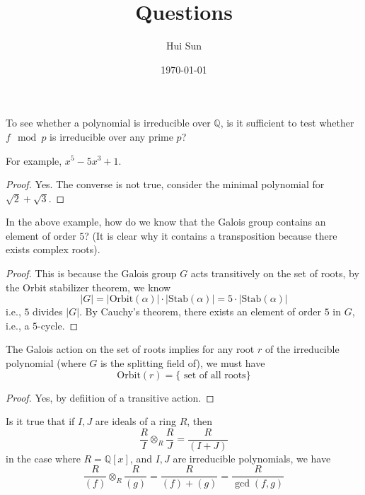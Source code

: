 \documentclass[openany]{book}
\title{Questions}
\date{\today}
\author{Hui Sun}
\newcommand{\Q}{\mathbb{Q}}
\begin{document}
\maketitle



\begin{prob}
    To see whether a polynomial is irreducible over $\Q$, is it sufficient to test whether $f\mod p$ is irreducible over any prime $p$?

    For example, $x^5-5x^3+1$.
\end{prob}
\begin{proof}
    Yes. The converse is not true, consider the minimal polynomial for $\sqrt{2}+\sqrt{3}$.
\end{proof}


\begin{prob}
    In the above example, how do we know that the Galois group contains an element of order $5$? (It is clear why it contains a transposition because there exists complex roots).
\end{prob}
\begin{proof}
    This is because the Galois group $G$ acts transitively on the set of roots, by the Orbit stabilizer theorem, we know 
    \begin{equation*}
        |G|=|\text{Orbit}(\alpha)|\cdot|\text{Stab}(\alpha)|=5\cdot|\text{Stab}(\alpha)|
    \end{equation*}
    i.e., $5$ divides $|G|$. By Cauchy's theorem, there exists an element of order $5$ in $G$, i.e., a $5$-cycle.
\end{proof}

\begin{prob}
    The Galois action on the set of roots implies for any root $r$ of the irreducible polynomial (where $G$ is the splitting field of), we must have 
    \begin{equation*}
        \text{Orbit}(r)=\{\text{ set of all roots}\}
    \end{equation*}
\end{prob}
\begin{proof}
    Yes, by defiition of a transitive action.
\end{proof}


\begin{prob}
    Is it true that if $I,J$ are ideals of a ring $R$, then 
    \begin{equation*}
        \frac{R}{I}\otimes_R\frac{R}{J}=\frac{R}{(I+J)}
    \end{equation*}
    in the case where $R=\Q[x]$, and $I,J$ are irreducible polynomials, we have 
    \begin{equation*}
        \frac{R}{(f)}\otimes_R\frac{R}{(g)}=\frac{R}{(f)+(g)}=\frac{R}{\gcd(f,g)}
    \end{equation*}
\end{prob}
\end{document}
